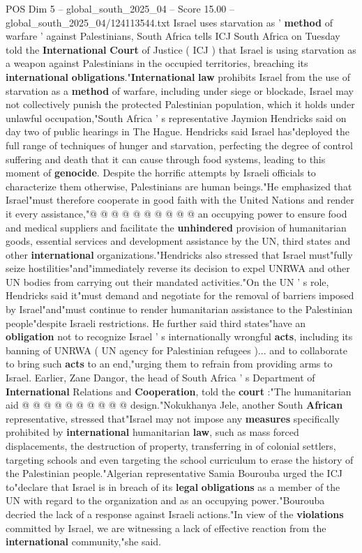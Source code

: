 \begin{textsample}{POS Dim 5 – global\_south\_2025\_04 – Score 15.00 – global\_south\_2025\_04/124113544.txt}  \label{ex:f5_pos_070}
Israel uses starvation as ' \textbf{method} of warfare ' against Palestinians, South Africa tells ICJ South Africa on Tuesday told the \textbf{International} \textbf{Court} of Justice ( ICJ ) that Israel is using starvation as a weapon against Palestinians in the occupied territories, breaching its \textbf{international} \textbf{obligations}."\textbf{International} \textbf{law} prohibits Israel from the use of starvation as a \textbf{method} of warfare, including under siege or blockade, Israel may not collectively punish the protected Palestinian population, which it holds under unlawful occupation,"South Africa ' s representative Jaymion Hendricks said on day two of public hearings in The Hague.
Hendricks said Israel has"deployed the full range of techniques of hunger and starvation, perfecting the degree of control suffering and death that it can cause through food systems, leading to this moment of \textbf{genocide}.
Despite the horrific attempts by Israeli officials to characterize them otherwise, Palestinians are human beings."He emphasized that Israel"must therefore cooperate in good faith with the United Nations and render it every assistance,"@ @ @ @ @ @ @ @ @ @ an occupying power to ensure food and medical suppliers and facilitate the \textbf{unhindered} provision of humanitarian goods, essential services and development assistance by the UN, third states and other \textbf{international} organizations."Hendricks also stressed that Israel must"fully seize hostilities"and"immediately reverse its decision to expel UNRWA and other UN bodies from carrying out their mandated activities."On the UN ' s role, Hendricks said it"must demand and negotiate for the removal of barriers imposed by Israel"and"must continue to render humanitarian assistance to the Palestinian people"despite Israeli restrictions.
He further said third states"have an \textbf{obligation} not to recognize Israel ' s internationally wrongful \textbf{acts}, including its banning of UNRWA ( UN agency for Palestinian refugees )... and to collaborate to bring such \textbf{acts} to an end,"urging them to refrain from providing arms to Israel.
Earlier, Zane Dangor, the head of South Africa ' s Department of \textbf{International} Relations and \textbf{Cooperation}, told the \textbf{court} :"The humanitarian aid @ @ @ @ @ @ @ @ @ @ design."Nokukhanya Jele, another South \textbf{African} representative, stressed that"Israel may not impose any \textbf{measures} specifically prohibited by \textbf{international} humanitarian \textbf{law}, such as mass forced displacements, the destruction of property, transferring in of colonial settlers, targeting schools and even targeting the school curriculum to erase the history of the Palestinian people."Algerian representative Samia Bourouba urged the ICJ to"declare that Israel is in breach of its \textbf{legal} \textbf{obligations} as a member of the UN with regard to the organization and as an occupying power."Bourouba decried the lack of a response against Israeli actions."In view of the \textbf{violations} committed by Israel, we are witnessing a lack of effective reaction from the \textbf{international} community,"she said.

\end{textsample}

